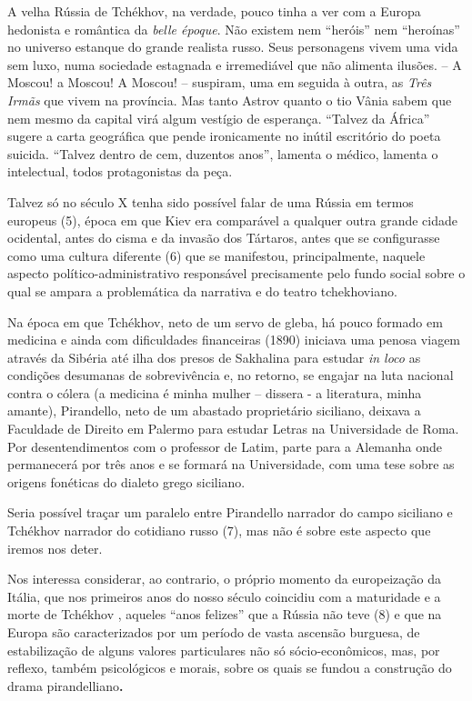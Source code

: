 A velha Rússia de Tchékhov, na verdade, pouco tinha a ver com a Europa
hedonista e romântica da \emph{belle époque}. Não existem nem ``heróis''
nem ``heroínas'' no universo estanque do grande realista russo. Seus
personagens vivem uma vida sem luxo, numa sociedade estagnada e
irremediável que não alimenta ilusões. -- A Moscou! a Moscou! A Moscou!
-- suspiram, uma em seguida à outra, as \emph{Três Irmãs} que vivem na
província. Mas tanto Astrov quanto o tio Vânia sabem que nem mesmo da
capital virá algum vestígio de esperança. ``Talvez da África'' sugere a
carta geográfica que pende ironicamente no inútil escritório do poeta
suicida. ``Talvez dentro de cem, duzentos anos'', lamenta o médico,
lamenta o intelectual, todos protagonistas da peça.

Talvez só no século X tenha sido possível falar de uma Rússia em termos
europeus (5), época em que Kiev era comparável a qualquer outra grande
cidade ocidental, antes do cisma e da invasão dos Tártaros, antes que se
configurasse como uma cultura diferente (6) que se manifestou,
principalmente, naquele aspecto político-administrativo responsável
precisamente pelo fundo social sobre o qual se ampara a problemática da
narrativa e do teatro tchekhoviano.

Na época em que Tchékhov, neto de um servo de gleba, há pouco formado em
medicina e ainda com dificuldades financeiras (1890) iniciava uma penosa
viagem através da Sibéria até ilha dos presos de Sakhalina para estudar
\emph{in loco} as condições desumanas de sobrevivência e, no retorno, se
engajar na luta nacional contra o cólera (a medicina é minha mulher --
dissera - a literatura, minha amante), Pirandello, neto de um abastado
proprietário siciliano, deixava a Faculdade de Direito em Palermo para
estudar Letras na Universidade de Roma. Por desentendimentos com o
professor de Latim, parte para a Alemanha onde permanecerá por três anos
e se formará na Universidade, com uma tese sobre as origens fonéticas do
dialeto grego siciliano.

Seria possível traçar um paralelo entre Pirandello narrador do campo
siciliano e Tchékhov narrador do cotidiano russo (7), mas não é sobre
este aspecto que iremos nos deter.

Nos interessa considerar, ao contrario, o próprio momento da
europeização da Itália, que nos primeiros anos do nosso século coincidiu
com a maturidade e a morte de Tchékhov , aqueles ``anos felizes'' que a
Rússia não teve (8) e que na Europa são caracterizados por um período de
vasta ascensão burguesa, de estabilização de alguns valores particulares
não só sócio-econômicos, mas, por reflexo, também psicológicos e morais,
sobre os quais se fundou a construção do drama pirandelliano\textbf{. }

